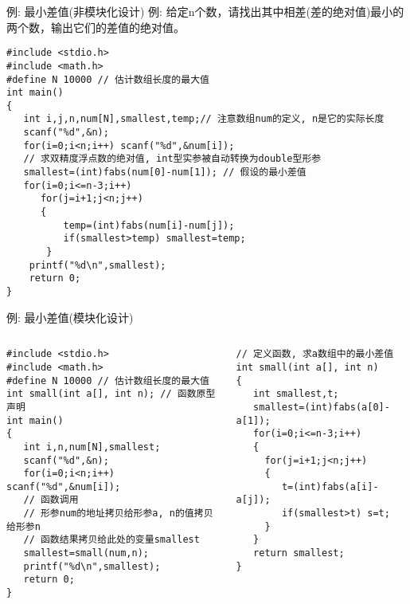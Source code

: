 \begin{frame}{例: 最小差值(非模块化设计)}
例: 给定n个数，请找出其中相差(差的绝对值)最小的两个数，输出它们的差值的绝对值。
\pause
\begin{lstlisting}
#include <stdio.h>
#include <math.h>
#define N 10000 // 估计数组长度的最大值
int main()
{
   int i,j,n,num[N],smallest,temp;// 注意数组num的定义, n是它的实际长度
   scanf("%d",&n);
   for(i=0;i<n;i++) scanf("%d",&num[i]);
   // 求双精度浮点数的绝对值, int型实参被自动转换为double型形参
   smallest=(int)fabs(num[0]-num[1]); // 假设的最小差值
   for(i=0;i<=n-3;i++)
      for(j=i+1;j<n;j++)
      {
          temp=(int)fabs(num[i]-num[j]);
          if(smallest>temp) smallest=temp;
       }
    printf("%d\n",smallest);
    return 0;
} 
\end{lstlisting}
\end{frame}

\begin{frame}{例: 最小差值(模块化设计)}
\begin{columns}[T]
\pause
\begin{lstlisting}
#include <stdio.h>
#include <math.h>
#define N 10000 // 估计数组长度的最大值
int small(int a[], int n); // 函数原型声明
int main()
{
   int i,n,num[N],smallest;
   scanf("%d",&n);
   for(i=0;i<n;i++) scanf("%d",&num[i]);
   // 函数调用
   // 形参num的地址拷贝给形参a, n的值拷贝给形参n
   // 函数结果拷贝给此处的变量smallest
   smallest=small(num,n); 
   printf("%d\n",smallest);
   return 0;
} 
\end{lstlisting}
\pause
\begin{lstlisting}
// 定义函数, 求a数组中的最小差值
int small(int a[], int n)
{
   int smallest,t;
   smallest=(int)fabs(a[0]-a[1]); 
   for(i=0;i<=n-3;i++)
   {
     for(j=i+1;j<n;j++)
     {
        t=(int)fabs(a[i]-a[j]);
        if(smallest>t) s=t;
     }
   }
   return smallest;
}
\end{lstlisting}
\end{columns}
~\\
\end{frame}

